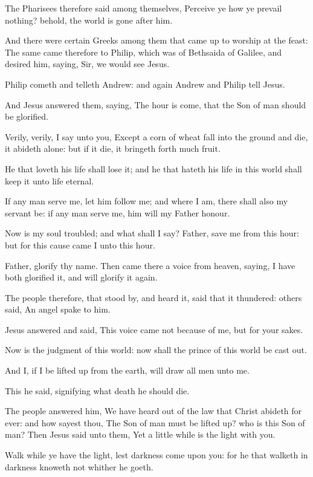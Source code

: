 \Verse The Pharisees therefore said among themselves, Perceive ye how ye prevail nothing? behold, the world is gone after him.

\Verse And there were certain Greeks among them that came up to worship at the feast: \Verse The same came therefore to Philip, which was of Bethsaida of Galilee, and desired him, saying, Sir, we would see Jesus.

\Verse Philip cometh and telleth Andrew: and again Andrew and Philip tell Jesus.

\Verse And Jesus answered them, saying, The hour is come, that the Son of man should be glorified.

\Verse Verily, verily, I say unto you, Except a corn of wheat fall into the ground and die, it abideth alone: but if it die, it bringeth forth much fruit.

\Verse He that loveth his life shall lose it; and he that hateth his life in this world shall keep it unto life eternal.

\Verse If any man serve me, let him follow me; and where I am, there shall also my servant be: if any man serve me, him will my Father honour.

\Verse Now is my soul troubled; and what shall I say? Father, save me from this hour: but for this cause came I unto this hour.

\Verse Father, glorify thy name. Then came there a voice from heaven, saying, I have both glorified it, and will glorify it again.

\Verse The people therefore, that stood by, and heard it, said that it thundered: others said, An angel spake to him.

\Verse Jesus answered and said, This voice came not because of me, but for your sakes.

\Verse Now is the judgment of this world: now shall the prince of this world be cast out.

\Verse And I, if I be lifted up from the earth, will draw all men unto me.

\Verse This he said, signifying what death he should die.

\Verse The people answered him, We have heard out of the law that Christ abideth for ever: and how sayest thou, The Son of man must be lifted up? who is this Son of man?  \Verse Then Jesus said unto them, Yet a little while is the light with you.

Walk while ye have the light, lest darkness come upon you: for he that walketh in darkness knoweth not whither he goeth.

